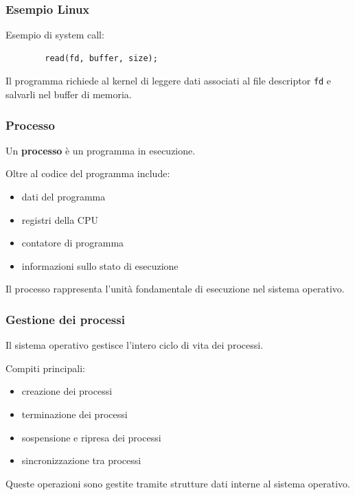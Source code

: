 \documentclass{beamer}
\begin{document}

\begin{frame}[fragile]
	\frametitle{Esempio Linux}
	
	Esempio di system call:
	
	\begin{verbatim}
		read(fd, buffer, size);
	\end{verbatim}
	
	Il programma richiede al kernel di leggere dati
	associati al file descriptor \texttt{fd} e salvarli
	nel buffer di memoria.
	
\end{frame}


\begin{frame}
	\frametitle{Processo}
	
	Un \textbf{processo} è un programma in esecuzione.
	
	Oltre al codice del programma include:
	
	\begin{itemize}
		\item dati del programma
		\item registri della CPU
		\item contatore di programma
		\item informazioni sullo stato di esecuzione
	\end{itemize}
	
	Il processo rappresenta l'unità fondamentale
	di esecuzione nel sistema operativo.
	
\end{frame}


\begin{frame}
	\frametitle{Gestione dei processi}
	
	Il sistema operativo gestisce l'intero ciclo
	di vita dei processi.
	
	Compiti principali:
	
	\begin{itemize}
		\item creazione dei processi
		\item terminazione dei processi
		\item sospensione e ripresa dei processi
		\item sincronizzazione tra processi
	\end{itemize}
	
	Queste operazioni sono gestite tramite
	strutture dati interne al sistema operativo.
	
\end{frame}
\end{document}
